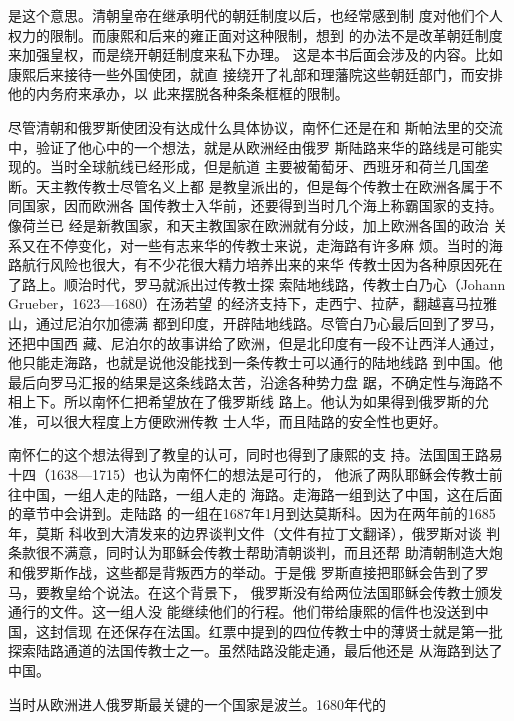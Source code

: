 是这个意思。清朝皇帝在继承明代的朝廷制度以后，也经常感到制%
度对他们个人权力的限制。而康熙和后来的雍正面对这种限制，想到%
的办法不是改革朝廷制度来加强皇权，而是绕开朝廷制度来私下办理。%
这是本书后面会涉及的内容。比如康熙后来接待一些外国使团，就直%
接绕开了礼部和理藩院这些朝廷部门，而安排他的内务府来承办，以%
此来摆脱各种条条框框的限制。%
\par
尽管清朝和俄罗斯使团没有达成什么具体协议，南怀仁还是在和%
斯帕法里的交流中，验证了他心中的一个想法，就是从欧洲经由俄罗%
斯陆路来华的路线是可能实现的。当时全球航线已经形成，但是航道%
主要被葡萄牙、西班牙和荷兰几国垄断。天主教传教士尽管名义上都%
是教皇派出的，但是每个传教士在欧洲各属于不同国家，因而欧洲各%
国传教士入华前，还要得到当时几个海上称霸国家的支持。像荷兰已%
经是新教国家，和天主教国家在欧洲就有分歧，加上欧洲各国的政治%
关系又在不停变化，对一些有志来华的传教士来说，走海路有许多麻%
烦。当时的海路航行风险也很大，有不少花很大精力培养出来的来华%
传教士因为各种原因死在了路上。顺治时代，罗马就派出过传教士探%
索陆地线路，传教士白乃心（Johann Grueber，1623—1680）在汤若望%
的经济支持下，走西宁、拉萨，翻越喜马拉雅山，通过尼泊尔加德满%
都到印度，开辟陆地线路。尽管白乃心最后回到了罗马，还把中国西%
藏、尼泊尔的故事讲给了欧洲，但是北印度有一段不让西洋人通过，%
他只能走海路，也就是说他没能找到一条传教士可以通行的陆地线路%
到中国。他最后向罗马汇报的结果是这条线路太苦，沿途各种势力盘%
踞，不确定性与海路不相上下。所以南怀仁把希望放在了俄罗斯线%
路上。他认为如果得到俄罗斯的允准，可以很大程度上方便欧洲传教%
士人华，而且陆路的安全性也更好。%
\par
南怀仁的这个想法得到了教皇的认可，同时也得到了康熙的支%
持。法国国王路易十四（1638—1715）也认为南怀仁的想法是可行的，%
他派了两队耶稣会传教士前往中国，一组人走的陆路，一组人走的%
海路。走海路一组到达了中国，这在后面的章节中会讲到。走陆路%
的一组在1687年1月到达莫斯科。因为在两年前的1685年，莫斯%
科收到大清发来的边界谈判文件（文件有拉丁文翻译），俄罗斯对谈%
判条款很不满意，同时认为耶稣会传教士帮助清朝谈判，而且还帮%
助清朝制造大炮和俄罗斯作战，这些都是背叛西方的举动。于是俄%
罗斯直接把耶稣会告到了罗马，要教皇给个说法。在这个背景下，%
俄罗斯没有给两位法国耶稣会传教士颁发通行的文件。这一组人没%
能继续他们的行程。他们带给康熙的信件也没送到中国，这封信现%
在还保存在法国。红票中提到的四位传教士中的薄贤士就是第一批%
探索陆路通道的法国传教士之一。虽然陆路没能走通，最后他还是%
从海路到达了中国。%
\par
当时从欧洲进人俄罗斯最关键的一个国家是波兰。1680年代的%
